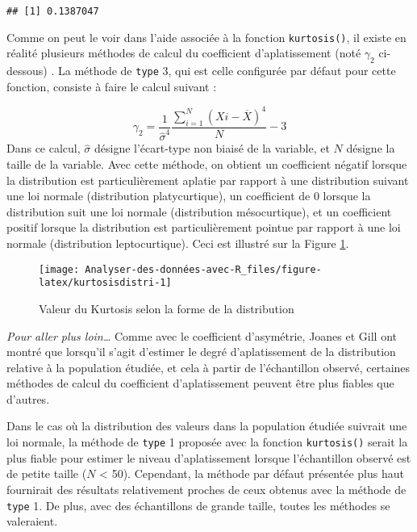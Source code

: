\documentclass[
  french,
]{book}
\begin{document}
\begin{verbatim}
## [1] 0.1387047
\end{verbatim}

Comme on peut le voir dans l'aide associée à la fonction \texttt{kurtosis()}, il existe en réalité plusieurs méthodes de calcul du coefficient d'aplatissement (noté \(\gamma_{2}\) ci-dessous) . La méthode de \texttt{type} 3, qui est celle configurée par défaut pour cette fonction, consiste à faire le calcul suivant :

\[\gamma_{2} =  \frac{1}{\hat{\sigma}^4} {\frac{\sum_{i=1}^{N} (X{i} - \overline{X})^4}{N}} -3\]
Dans ce calcul, \(\hat{\sigma}\) désigne l'écart-type non biaisé de la variable, et \(N\) désigne la taille de la variable. Avec cette méthode, on obtient un coefficient négatif lorsque la distribution est particulièrement aplatie par rapport à une distribution suivant une loi normale (distribution platycurtique), un coefficient de 0 lorsque la distribution suit une loi normale (distribution mésocurtique), et un coefficient positif lorsque la distribution est particulièrement pointue par rapport à une loi normale (distribution leptocurtique). Ceci est illustré sur la Figure \ref{fig:kurtosisdistri}.

\begin{figure}

{\centering \texttt{[image: Analyser-des-données-avec-R\_files/figure-latex/kurtosisdistri-1]} 

}

\caption{Valeur du Kurtosis selon la forme de la distribution}\label{fig:kurtosisdistri}
\end{figure}

\emph{Pour aller plus loin\ldots{}}
Comme avec le coefficient d'asymétrie, Joanes et Gill \autocite*{joanesComparingMeasuresSample1998} ont montré que lorsqu'il s'agit d'estimer le degré d'aplatissement de la distribution relative à la population étudiée, et cela à partir de l'échantillon observé, certaines méthodes de calcul du coefficient d'aplatissement peuvent être plus fiables que d'autres.

Dans le cas où la distribution des valeurs dans la population étudiée suivrait une loi normale, la méthode de \texttt{type} 1 proposée avec la fonction \texttt{kurtosis()} serait la plus fiable pour estimer le niveau d'aplatissement lorsque l'échantillon observé est de petite taille (\(N\) \textless{} 50). Cependant, la méthode par défaut présentée plus haut fournirait des résultats relativement proches de ceux obtenus avec la méthode de \texttt{type} 1. De plus, avec des échantillons de grande taille, toutes les méthodes se valeraient.
\end{document}
